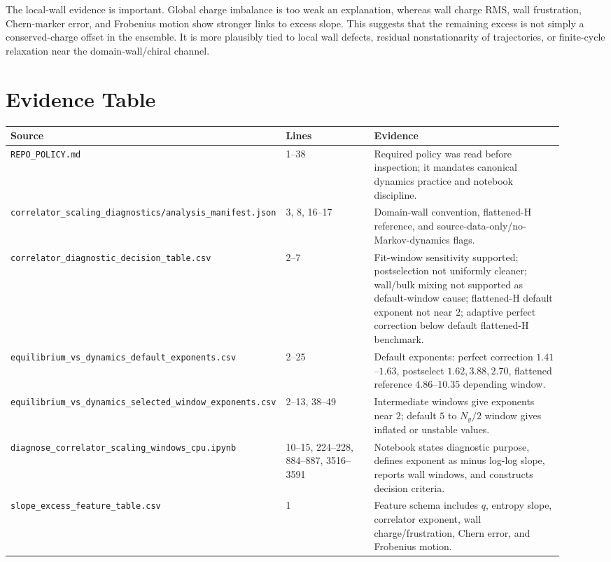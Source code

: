 \documentclass[aps,prb,onecolumn,nofootinbib,superscriptaddress]{revtex4-2}
\begin{document}
The local-wall evidence is important. Global charge imbalance is too weak an explanation, whereas wall charge RMS, wall frustration, Chern-marker error, and Frobenius motion show stronger links to excess slope. This suggests that the remaining excess is not simply a conserved-charge offset in the ensemble. It is more plausibly tied to local wall defects, residual nonstationarity of trajectories, or finite-cycle relaxation near the domain-wall/chiral channel.

\section{Evidence Table}

\begin{center}
\begin{tabular}{p{0.30\linewidth}p{0.20\linewidth}p{0.42\linewidth}}
\toprule
Source & Lines & Evidence \\
\midrule
\texttt{REPO\_POLICY.md} & 1--38 & Required policy was read before inspection; it mandates canonical dynamics practice and notebook discipline. \\
\texttt{correlator\_scaling\_diagnostics/analysis\_manifest.json} & 3, 8, 16--17 & Domain-wall convention, flattened-H reference, and source-data-only/no-Markov-dynamics flags. \\
\texttt{correlator\_diagnostic\_decision\_table.csv} & 2--7 & Fit-window sensitivity supported; postselection not uniformly cleaner; wall/bulk mixing not supported as default-window cause; flattened-H default exponent not near \(2\); adaptive perfect correction below default flattened-H benchmark. \\
\texttt{equilibrium\_vs\_dynamics\_default\_exponents.csv} & 2--25 & Default exponents: perfect correction \(1.41\)--\(1.63\), postselect \(1.62,3.88,2.70\), flattened reference \(4.86\)--\(10.35\) depending window. \\
\texttt{equilibrium\_vs\_dynamics\_selected\_window\_exponents.csv} & 2--13, 38--49 & Intermediate windows give exponents near \(2\); default \(5\) to \(N_y/2\) window gives inflated or unstable values. \\
\texttt{diagnose\_correlator\_scaling\_windows\_cpu.ipynb} & 10--15, 224--228, 884--887, 3516--3591 & Notebook states diagnostic purpose, defines exponent as minus log-log slope, reports wall windows, and constructs decision criteria. \\
\texttt{slope\_excess\_feature\_table.csv} & 1 & Feature schema includes \(q\), entropy slope, correlator exponent, wall charge/frustration, Chern error, and Frobenius motion. \\

\end{tabular}
\end{center}
\end{document}
